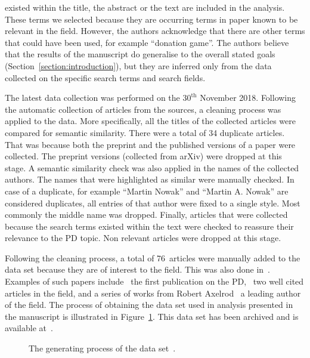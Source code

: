 \documentclass{article}
\theoremstyle{definition}
\newcommand{\manual}{76}
\begin{document}
existed within the title, the abstract or the text are included in the analysis.
These terms we selected because they are occurring terms in paper known to be
relevant in the field. However, the authors acknowledge that there are other
terms that could have been used, for example ``donation game''. The authors believe
that the results of the manuscript do generalise to the overall stated goals
(Section~\ref{section:introduction}), but they are inferred only from
the data collected on the specific search terms and search fields.

The latest data collection was performed on the \(30^{\text{th}}\) November
2018. Following the automatic collection of articles from the sources, a
cleaning process was applied to the data. More specifically, all the titles of
the collected articles were compared for semantic similarity. There were a total
of 34 duplicate articles. That was because both the preprint and the published
versions of a paper were collected. The preprint versions
(collected from arXiv) were dropped at this stage. A semantic similarity check
was also applied in the names of the collected authors. The names that were
highlighted as similar were manually checked. In case of a duplicate, for
example ``Martin Nowak'' and ``Martin A. Nowak'' are considered duplicates, all
entries of that author were fixed to a single style. Most commonly the middle
name was dropped. Finally, articles that were collected because the search terms
existed within the text were checked to reassure their relevance to the PD
topic. Non relevant articles were dropped at this stage. 

Following the cleaning process, a total of \manual~articles were manually added
to the data set because they are of interest to the field. This was also done
in~\cite{Liu2015}. Examples of such papers include~\cite{Flood1958} the first publication on the
PD,~\cite{Ohtsuki2006, Stewart2012} two well cited articles in the field, and a
series of works from Robert Axelrod~\cite{Axelrod1980, Axelrod1980more,
Axelrod1987, Axelrod1981, Riolo2001} a leading author of the field.
The process of obtaining the data set used in analysis presented in the
manuscript is illustrated in Figure~\ref{figure:colection_process}.
This data set has been archived and is available at~\cite{pd_data_2018}.

\begin{figure}[!hbtp]
    \begin{center}
        
    \end{center}
    \caption{The generating process of the data set~\cite{pd_data_2018}.}\label{figure:colection_process}
\end{figure}
\end{document}
